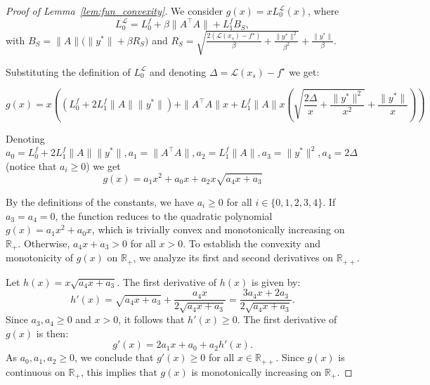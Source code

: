 \documentclass[10pt,a4paper]{amsart}
\begin{document}
	\begin{proof}[Proof of Lemma~\ref{lem:fun_convexity}]
		We consider $g(x) = x L_0^{\mathcal{L}}(x)$, where 
		$$
		L_0^{\mathcal{L}}
		=
		L_0^f
		+
		\beta\|A^\top A\|
		+
		L_1^f B_S,
		$$
		with
		$B_S=\|A\|\bigl(\|y^*\|+\beta R_S\bigr)$
		and
		$R_S=\sqrt{\frac{2(\mathcal{L}(x_s)-f^\star)}{\beta}+\frac{\|y^*\|^2}{\beta^2}}+\frac{\|y^*\|}{\beta}.$
		
		Substituting the definition of $L_0^{\mathcal{L}}$ and denoting $\Delta = \mathcal{L}(x_s)-f^\star$ we get:
		
		$$
		g(x) = x \left( \left( L_0^f + 2 L_1^f \| A \| \| y^* \| \right) + \| A^\top A\| x + L_1^f \| A \| x \left(\sqrt{\frac{2 \Delta}{x} + \frac{\| y^* \|^2}{x^2} } + \frac{\| y^* \|}{x} \right) \right)
		$$
		
		Denoting $a_0 = L_0^f + 2 L_1^f \| A \| \| y^* \|, a_1 = \| A^\top A\|, a_2 = L_1^f \| A \|, a_3 = \| y^* \|^2, a_4 = 2 \Delta$ (notice that $a_i \geq 0$) we get
		\begin{equation}\label{lem:fun_convexity:eq_a}
			g(x) = a_1 x^2 + a_0 x + a_2 x \sqrt{a_4 x + a_3}
		\end{equation}
		
		By the definitions of the constants, we have $a_i \geq 0$ for all $i \in \{0, 1, 2, 3, 4\}$. 
		If $a_3 = a_4 = 0$, the function reduces to the quadratic polynomial $g(x) = a_1 x^2 + a_0 x$, which is trivially convex and monotonically increasing on $\mathbb{R}_{+}$. 
		Otherwise, $a_4 x + a_3 > 0$ for all $x > 0$. To establish the convexity and monotonicity of $g(x)$ on $\mathbb{R}_{+}$, we analyze its first and second derivatives on $\mathbb{R}_{++}$.
		
		Let $h(x) = x \sqrt{a_4 x + a_3}$. The first derivative of $h(x)$ is given by:
		\begin{equation*}
			h'(x) = \sqrt{a_4 x + a_3} + \frac{a_4 x}{2\sqrt{a_4 x + a_3}} = \frac{3a_4 x + 2a_3}{2\sqrt{a_4 x + a_3}}.
		\end{equation*}
		Since $a_3, a_4 \geq 0$ and $x > 0$, it follows that $h'(x) \geq 0$. 
		The first derivative of $g(x)$ is then:
		\begin{equation*}
			g'(x) = 2a_1 x + a_0 + a_2 h'(x).
		\end{equation*}
		As $a_0, a_1, a_2 \geq 0$, we conclude that $g'(x) \geq 0$ for all $x \in \mathbb{R}_{++}$. Since $g(x)$ is continuous on $\mathbb{R}_{+}$, this implies that $g(x)$ is monotonically increasing on $\mathbb{R}_{+}$.
		

\end{proof}
\end{document}
